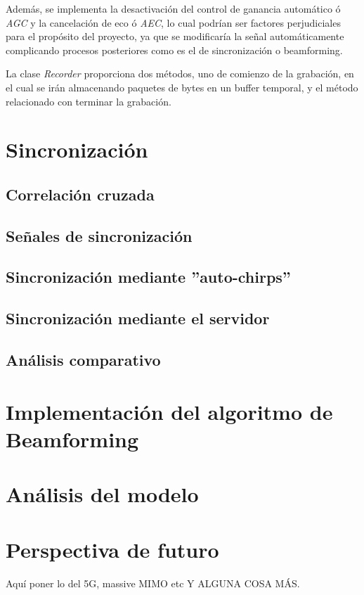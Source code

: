 \documentclass[a4paper,11pt]{book}
\begin{document}
\begin{itemize}
	Además, se implementa la desactivación del control de ganancia automático ó \textit{AGC} y la cancelación de eco ó \textit{AEC}, lo cual podrían ser factores perjudiciales para el propósito del proyecto, ya que se modificaría la señal automáticamente complicando procesos posteriores como es el de sincronización o beamforming.
	
	La clase \textit{Recorder} proporciona dos métodos, uno de comienzo de la grabación, en el cual se irán almacenando paquetes de bytes en un buffer temporal, y el método relacionado con terminar la grabación.
	\end{itemize}
	
	
	
\chapter{Sincronización}
\section{Correlación cruzada}
\section{Señales de sincronización}
\section{Sincronización mediante ''auto-chirps''}
\section{Sincronización mediante el servidor}
\section{Análisis comparativo}


\chapter{Implementación del algoritmo de Beamforming}

\chapter{Análisis del modelo}

\chapter{Perspectiva de futuro}
Aquí poner lo del 5G, massive MIMO etc Y ALGUNA COSA MÁS.
\end{document}
